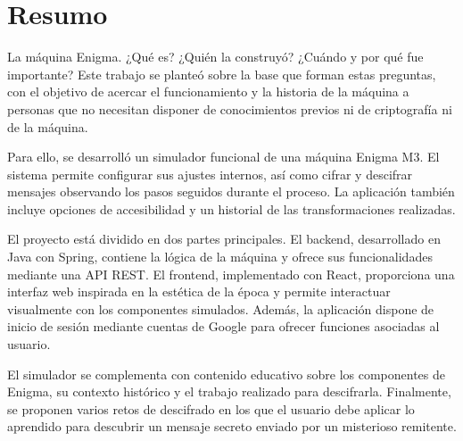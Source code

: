 \pagestyle{plain}
\chapter*{Resumo}

La máquina Enigma. ¿Qué es? ¿Quién la construyó? ¿Cuándo y por qué fue importante?
Este trabajo se planteó sobre la base que forman estas preguntas, con el objetivo de
acercar el funcionamiento y la historia de la máquina a personas que no necesitan
disponer de conocimientos previos ni de criptografía ni de la máquina.

Para ello, se desarrolló un simulador funcional de una máquina Enigma M3. El sistema
permite configurar sus ajustes internos, así como cifrar y descifrar mensajes observando
los pasos seguidos durante el proceso. La aplicación también incluye opciones de 
accesibilidad y un historial de las transformaciones realizadas.

El proyecto está dividido en dos partes principales. El backend, desarrollado en Java
con Spring, contiene la lógica de la máquina y ofrece sus funcionalidades mediante una
API REST. El frontend, implementado con React, proporciona una interfaz web inspirada
en la estética de la época y permite interactuar visualmente con los componentes
simulados. Además, la aplicación dispone de inicio de sesión mediante cuentas de Google
para ofrecer funciones asociadas al usuario.

El simulador se complementa con contenido educativo sobre los componentes de Enigma,
su contexto histórico y el trabajo realizado para descifrarla. Finalmente, 
se proponen varios retos de descifrado en los que el usuario debe aplicar lo 
aprendido para descubrir un mensaje secreto enviado por un misterioso remitente.
